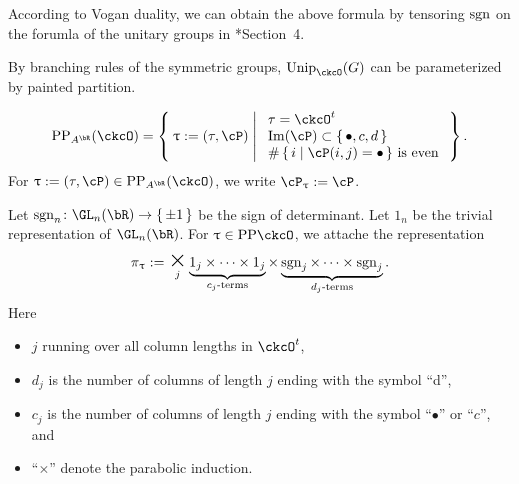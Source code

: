\documentclass[counting_main.tex]{subfiles}
\begin{document}
According to Vogan duality,  we can obtain the above formula by tensoring $\operatorname{sgn}$
on the forumla of the unitary groups in \cite{BV.W}*{Section~4}.

By branching rules of the symmetric groups,  $\Unip_{\ckcO}(G)$ can be parameterized by painted partition.

\begin{equation}\label{eq:PP.AR}
\PP_{A^{\bR}}(\ckcO) = \Set{\uptau:=(\tau, \cP)|
  \begin{array}{l}
    \text{$\tau = \ckcO^{t}$}\\
    \text{$\Im(\cP)\subset \set{\bullet,c,d}$}\\
    \text{$\#\set{i|\cP(i,j)=\bullet}$ is even}
  \end{array}
}.
\end{equation}
For $\uptau:=(\tau,\cP)\in \PP_{A^{\bR}}(\ckcO)$, we write $\cP_{\uptau}:= \cP$.


Let $\sgn_n\colon \GL_n(\bR)\rightarrow \set{\pm 1}$ be the sign of determinant.
Let $1_n$ be the trivial representation of $\GL_n(\bR)$.
For $\uptau\in \PP{\ckcO}$, we attache the representation
\begin{equation}\label{eq:u.GLR}
\pi_\uptau :=
\bigtimes_{j} \underbrace{1_j \times \cdots \times 1_j}_{c_j\text{-terms}}\times
\underbrace{\sgn_j \times \cdots \times {\sgn_j} }_{d_j\text{-terms}}.
\end{equation}
Here
\begin{itemize}
  \item
$j$ running over all column lengths in $\ckcO^t$,
\item $d_j$ is the number of
columns of length $j$ ending with the symbol ``d'',
\item  $c_j$ is the number of
columns of length $j$ ending with the symbol ``$\bullet$'' or ``$c$'', and
\item  ``$\times$'' denote the parabolic induction.
\end{itemize}
\end{document}
